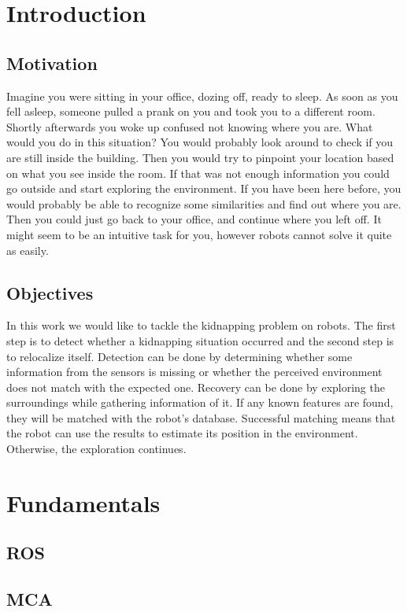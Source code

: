 \chapter{Introduction}
\section{Motivation}

Imagine you were sitting in your office, dozing off, ready to sleep. As soon as you fell asleep, someone pulled a prank on you and took you to a different room. Shortly afterwards you woke up confused not knowing where you are. What would you do in this situation? You would probably look around to check if you are still inside the building. Then you would try to pinpoint your location based on what you see inside the room. If that was not enough information you could go outside and start exploring the environment. If you have been here before, you would probably be able to recognize some similarities and find out where you are. Then you could just go back to your office, and continue where you left off. It might seem to be an intuitive task for you, however robots cannot solve it quite as easily.

\section{Objectives}

In this work we would like to tackle the kidnapping problem on robots. The first step is to detect whether a kidnapping situation occurred and the second step is to relocalize itself. Detection can be done by determining whether some information from the sensors is missing or whether the perceived environment does not match with the expected one. Recovery can be done by exploring the surroundings while gathering  information of it. If any known features are found, they will be matched with the robot's database. Successful matching means that the robot can use the results to estimate its position in the environment. Otherwise, the exploration continues.

\chapter{Fundamentals}
\section{ROS}
\section{MCA}
